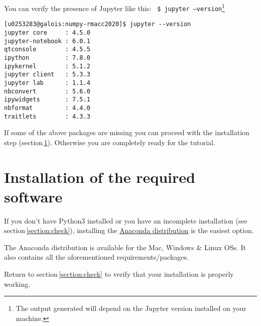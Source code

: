 \documentclass[11pt]{article}
\begin{document}
You can verify the presence of Jupyter like this:\newline\newline
\texttt{
\$ jupyter --version}\footnote{The output generated will depend on the Jupyter version installed on your machine.}
\begin{verbatim}
[u0253283@galois:numpy-rmacc2020]$ jupyter --version
jupyter core     : 4.5.0
jupyter-notebook : 6.0.1
qtconsole        : 4.5.5
ipython          : 7.8.0
ipykernel        : 5.1.2
jupyter client   : 5.3.3
jupyter lab      : 1.1.4
nbconvert        : 5.6.0
ipywidgets       : 7.5.1
nbformat         : 4.4.0
traitlets        : 4.3.3
\end{verbatim}

If some of the above packages are missing you can proceed with 
the installation step (section\,\ref{section:install}). Otherwise 
you are completely ready for the tutorial.
 
\section{Installation of the required software}\label{section:install}
If you don't have Python$3$ installed or you have an incomplete installation 
(see section\,\ref{section:check}),
installing the \href{https://www.anaconda.com/download/}{Anaconda distribution} is 
the easiest option.

The Anaconda distribution is available for the Mac, Windows \& Linux OSs. 
It also contains all the aforementioned requirements/packages.

Return to section\,\ref{section:check} to verify that your installation is properly working.

%
%
\end{document}
